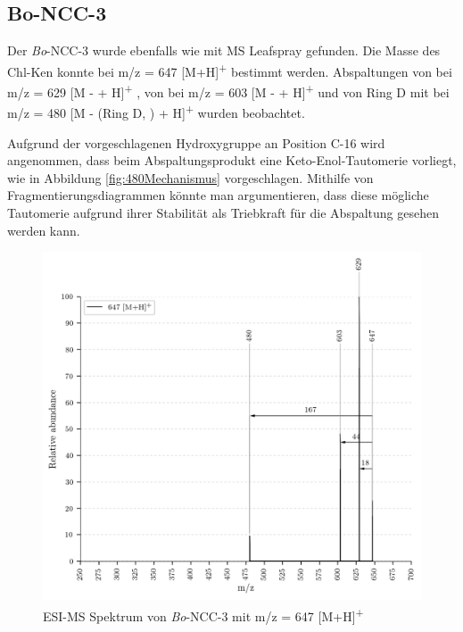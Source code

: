 \pagebreak
\subsection{Bo-NCC-3} \label{sec:ESIMSBoNCC3}

Der \textit{Bo}-NCC-3 wurde ebenfalls wie mit MS Leafspray gefunden. Die Masse des \gls{Chl-K}en konnte bei m/z = 647 [M+H]\textsuperscript{+} bestimmt werden. Abspaltungen von  bei m/z = 629 [M -  + H]\textsuperscript{+} , von  bei m/z = 603 [M -  + H]\textsuperscript{+} und von Ring D mit  bei m/z = 480 [M - (Ring D, ) + H]\textsuperscript{+} wurden beobachtet. 

Aufgrund der vorgeschlagenen Hydroxygruppe an Position C-16 wird angenommen, dass beim Abspaltungsprodukt eine Keto-Enol-Tautomerie vorliegt, wie in Abbildung \ref{fig:480Mechanismus} vorgeschlagen. Mithilfe von Fragmentierungsdiagrammen könnte man argumentieren, dass diese mögliche Tautomerie aufgrund ihrer Stabilität als Triebkraft für die Abspaltung gesehen werden kann.

\begin{figure}[!htbp]
  \centering
  \includegraphics[width=\textwidth, height=0.6\textwidth]{figures/Kapitel7/Kataboliten/VWA_MS_647.png}
  \caption[ESI-MS Spektrum von \textit{Bo}-NCC-3, Quelle: Autor]{ESI-MS Spektrum von \textit{Bo}-NCC-3 mit m/z = 647 [M+H]\textsuperscript{+}}
  \label{fig:647MH}
\end{figure}


